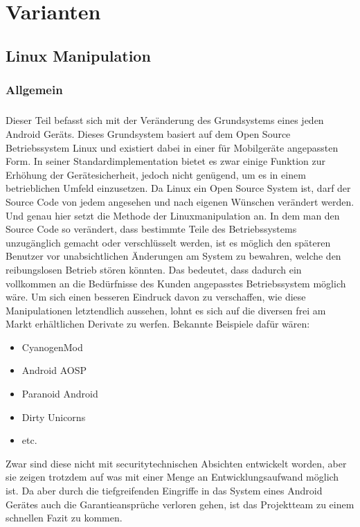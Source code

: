 \chapter{Varianten}
\section{Linux Manipulation}
\subsection{Allgemein}
\paragraph*{}
Dieser Teil befasst sich mit der Veränderung des Grundsystems eines jeden Android Geräts. Dieses Grundsystem basiert auf dem Open Source Betriebssystem Linux und existiert dabei in einer für Mobilgeräte angepassten Form. In seiner Standardimplementation bietet es zwar einige Funktion zur Erhöhung der Gerätesicherheit, jedoch nicht genügend, um es in einem betrieblichen Umfeld einzusetzen. Da Linux ein Open Source System ist, darf der Source Code von jedem angesehen und nach eigenen Wünschen verändert werden. Und genau hier setzt die Methode der Linuxmanipulation an. In dem man den Source Code so verändert, dass bestimmte Teile des Betriebssystems unzugänglich gemacht oder verschlüsselt werden, ist es möglich den späteren Benutzer vor unabsichtlichen Änderungen am System zu bewahren, welche den reibungslosen Betrieb stören könnten. Das bedeutet, dass dadurch ein vollkommen an die Bedürfnisse des Kunden angepasstes Betriebssystem möglich wäre. Um sich einen besseren Eindruck davon zu verschaffen, wie diese Manipulationen letztendlich aussehen, lohnt es sich auf die diversen frei am Markt erhältlichen Derivate zu werfen. Bekannte Beispiele dafür wären:
\begin{itemize}
	\item CyanogenMod
	\item Android AOSP
	\item Paranoid Android
	\item Dirty Unicorns
	\item etc.
\end{itemize}
Zwar sind diese nicht mit securitytechnischen Absichten entwickelt worden, aber sie zeigen trotzdem auf was mit einer Menge an Entwicklungsaufwand möglich ist. Da aber durch die tiefgreifenden Eingriffe in das System eines Android Gerätes auch die Garantieansprüche verloren gehen, ist das Projektteam zu einem schnellen Fazit zu kommen.
\newpage

